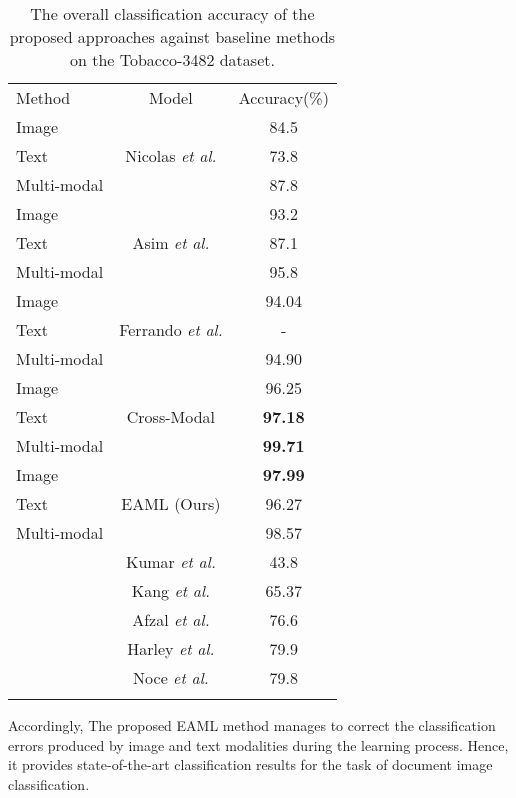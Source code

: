 \documentclass[twocolumn]{svjour3}
\newcommand{\etal}{\textit{et al.}}
\begin{document}
\begin{table}[tbh]
\small
\centering
\caption{The overall classification accuracy of the proposed approaches against baseline methods on the Tobacco-3482 dataset.}

    \begin{tabular}{lcc}
    \hline\noalign{\smallskip}
     Method & Model & Accuracy(\%)\\
     \noalign{\smallskip}\hline\noalign{\smallskip}
    Image & \multirow{3}{*}{Nicolas \etal \cite{audebert2019multimodal}} & 84.5\\
    Text && 73.8\\
    Multi-modal && 87.8\\
    \noalign{\smallskip}\hline\noalign{\smallskip}
    Image & \multirow{3}{*}{Asim \etal \cite{Asim2019TwoSD}} & 93.2\\
    Text && 87.1\\
    Multi-modal && 95.8\\
    \noalign{\smallskip}\hline\noalign{\smallskip}
    Image & \multirow{3}{*}{Ferrando \etal \cite{Ferrando2020ImprovingAA}} & 94.04\\
    Text && -\\
    Multi-modal && 94.90\\
    \noalign{\smallskip}\hline\noalign{\smallskip}
    Image & \multirow{3}{*}{Cross-Modal \cite{9191268}} & 96.25\\
    Text && \textbf{97.18}\\
    Multi-modal && \textbf{99.71}\\
    \noalign{\smallskip}\hline\noalign{\smallskip}
    Image & \multirow{3}{*}{EAML (Ours)} & \textbf{97.99}\\
    Text && 96.27\\
    Multi-modal && 98.57\\
    \noalign{\smallskip}\hline\noalign{\smallskip}
    \multirow{5}{*}{Baselines} 
    & Kumar \etal \cite{Kumar2014StructuralSF} & 43.8\\
    & Kang \etal \cite{6977258} & 65.37\\
    & Afzal \etal \cite{Afzal2015DeepdocclassifierDC} & 76.6\\
    & Harley \etal \cite{Harley2015EvaluationOD} & 79.9\\
    & Noce \etal \cite{Noce2016EmbeddedTC} & 79.8\\
    \noalign{\smallskip}\hline
    \end{tabular}
    \label{tab:ComparisontableonTobacco}
\end{table}
Accordingly, The proposed EAML method manages to correct the classification errors produced by image and text modalities during the learning process. Hence, it provides state-of-the-art classification results for the task of document image classification. 
\end{document}
